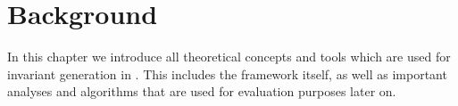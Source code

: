 \chapter{Background}
In this chapter we introduce all theoretical concepts and tools which are used for invariant generation in \CPAchecker{}. This includes the framework \CPAchecker{} itself, as well as important analyses and algorithms that are used for evaluation purposes later on.






